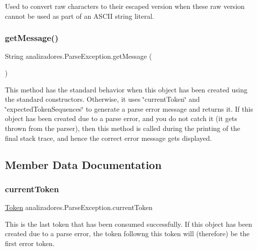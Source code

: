Used to convert raw characters to their escaped version when these raw version cannot be used as part of an A\+S\+C\+II string literal. \mbox{\label{classanalizadores_1_1_parse_exception_a6b54780b5e7d3ca5f905cef4a218eff6}} 
\subsubsection{\texorpdfstring{get\+Message()}{getMessage()}}
{\footnotesize\ttfamily String analizadores.\+Parse\+Exception.\+get\+Message (\begin{DoxyParamCaption}{ }\end{DoxyParamCaption})}

This method has the standard behavior when this object has been created using the standard constructors. Otherwise, it uses \char`\"{}current\+Token\char`\"{} and \char`\"{}expected\+Token\+Sequences\char`\"{} to generate a parse error message and returns it. If this object has been created due to a parse error, and you do not catch it (it gets thrown from the parser), then this method is called during the printing of the final stack trace, and hence the correct error message gets displayed. 

\subsection{Member Data Documentation}
\mbox{\label{classanalizadores_1_1_parse_exception_a5e7dae6899708a852cc7410e52d090f2}} 
\subsubsection{\texorpdfstring{current\+Token}{currentToken}}
{\footnotesize\ttfamily \mbox{\hyperlink{classanalizadores_1_1_token}{Token}} analizadores.\+Parse\+Exception.\+current\+Token}

This is the last token that has been consumed successfully. If this object has been created due to a parse error, the token followng this token will (therefore) be the first error token. \mbox{\label{classanalizadores_1_1_parse_exception_a6dceb2e8353ece2d7d2e2b86a8c7147d}} 
